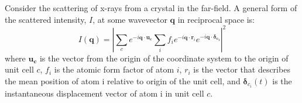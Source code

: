 \documentclass{article}
\begin{document}
Consider the scattering of x-rays from a crystal in the far-field. A general form of the scattered intensity, $I$, at some wavevector $\mathbf{q}$ in reciprocal space is:
\begin{equation}
I(\mathbf{q}) = \left| \sum\limits_{c} e^{-i \mathbf{q} \cdot \mathbf{u_c} } \sum\limits_{i} f_i e^{-i \mathbf{q} \cdot \mathbf{r}_i} e^{-i \mathbf{q} \cdot \boldsymbol{\delta_{c_i}}} \right| ^2
\end{equation}
where $\mathbf{u_c}$ is the vector from the origin of the coordinate system to the origin of unit cell $c$, $f_i$ is the atomic form factor of atom $i$, $r_i$ is the vector that describes the mean position of atom i relative to origin of the unit cell, and $\boldsymbol{\delta}_{c_i}(t)$ is the instantaneous displacement vector of atom i in unit cell $c$.
\end{document}
